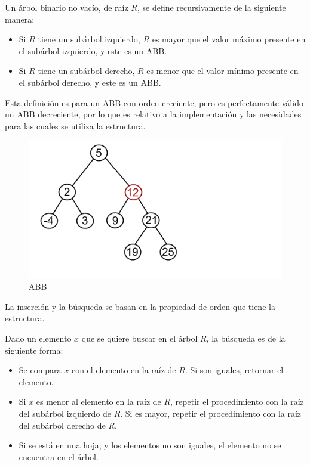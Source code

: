 \documentclass[11pt,letterpaper]{article}
\begin{document}
Un árbol binario no vacío, de raíz $R$, se define recursivamente de la siguiente manera:
\begin{itemize}
\item Si $R$ tiene un subárbol izquierdo, $R$ es mayor que el valor máximo presente en el subárbol izquierdo, y este es un ABB.
\item Si $R$ tiene un subárbol derecho, $R$ es menor que el valor mínimo presente en el subárbol derecho, y este es un ABB.
\end{itemize}

Esta definición es para un ABB con orden creciente, pero es perfectamente válido un ABB decreciente, por lo que es relativo a la implementación y las necesidades para las cuales se utiliza la estructura.
	
\begin{figure}[htb]
	\centerline{\includegraphics[scale=0.6]{img/bst.png}}
	\caption{ABB} \label{bst}
\end{figure}

La inserción y la búsqueda se basan en la propiedad de orden que tiene la estructura.

Dado un elemento $x$ que se quiere buscar en el árbol $R$, la búsqueda es de la siguiente forma:
\begin{itemize}
\item Se compara $x$ con el elemento en la raíz de $R$. Si son iguales, retornar el elemento.
\item Si $x$ es menor al elemento en la raíz de $R$, repetir el procedimiento con la raíz del subárbol izquierdo de $R$. Si es mayor, repetir el procedimiento con la raíz del subárbol derecho de $R$.
\item Si se está en una hoja, y los elementos no son iguales, el elemento no se encuentra en el árbol.
\end{itemize}
\end{document}
